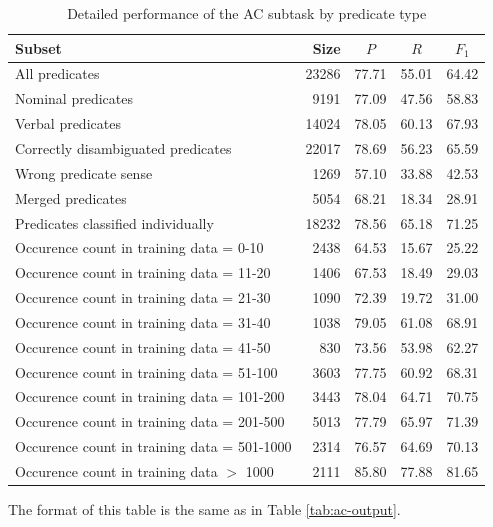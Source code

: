 \documentclass[12pt,notitlepage]{report}
\begin{document}
\begin{table}[htb]\footnotesize
\caption{Detailed performance of the AC subtask by predicate type}\label{tab:ac-preds}
\begin{center}
\begin{tabular}{|l|r|c|c|c|}\hline
\bf Subset & \bf Size & $P$ & $R$ & $F_1$ \\\hline\hline
All predicates & 23286 & 77.71 & 55.01 & 64.42 \\\hline
Nominal predicates & 9191 & 77.09 & 47.56 & 58.83 \\
Verbal predicates & 14024 & 78.05 & 60.13 & 67.93 \\\hline
Correctly disambiguated predicates & 22017 & 78.69 & 56.23 & 65.59 \\
Wrong predicate sense & 1269 & 57.10 & 33.88 & 42.53 \\\hline\hline
Merged predicates & 5054 & 68.21 & 18.34 & 28.91 \\
Predicates classified individually & 18232 & 78.56 & 65.18 & 71.25 \\\hline
Occurence count in training data = \hfill 0-10 & 2438 & 64.53 & 15.67 & 25.22 \\
Occurence count in training data = \hfill 11-20 & 1406 & 67.53 & 18.49 & 29.03 \\
Occurence count in training data = \hfill 21-30 & 1090 & 72.39 & 19.72 & 31.00 \\
Occurence count in training data = \hfill 31-40 & 1038 & 79.05 & 61.08 & 68.91 \\
Occurence count in training data = \hfill 41-50 & 830 & 73.56 & 53.98 & 62.27 \\
Occurence count in training data = \hfill 51-100 & 3603 & 77.75 & 60.92 & 68.31 \\
Occurence count in training data = \hfill 101-200 & 3443 & 78.04 & 64.71 & 70.75 \\
Occurence count in training data = \hfill 201-500 & 5013 & 77.79 & 65.97 & 71.39 \\
Occurence count in training data = \hfill 501-1000 & 2314 & 76.57 & 64.69 & 70.13 \\
Occurence count in training data $>$ \hfill 1000 & 2111 & 85.80 & 77.88 & 81.65 \\\hline
\end{tabular}
\end{center}
The format of this table is the same as in Table \ref{tab:ac-output}.
\end{table}
\end{document}
